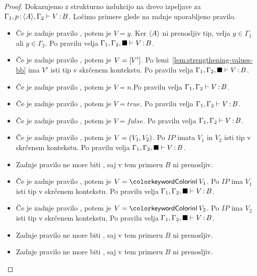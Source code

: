 \begin{proof}
	Dokazujemo z strukturno indukcijo na drevo izpeljave za $\Gamma_1, p \mathinner{:} \langle A \rangle, \Gamma_2 \vdash V \mathinner{:} B$.
	Ločimo primere glede na zadnje uporabljeno pravilo.
	
	\begin{itemize}
		\item Če je zadnje pravilo , potem je $V = y$. Ker $\langle A \rangle$ ni prenosljiv tip, velja $y \in \Gamma_1$ ali $y \in \Gamma_2$.
		Po pravilu  velja $\Gamma_1, \Gamma_2, \blacksquare \vdash V \mathinner{:} B$.
		
		\item Če je zadnje pravilo , potem je $V = [V']$.
		Po lemi~\ref{lem:strengthening-values-bb} ima $V'$ isti tip v skrčenem kontekstu.
		Po pravilu  velja $\Gamma_1, \Gamma_2, \blacksquare \vdash V \mathinner{:} B$.
		
		\item Če je zadnje pravilo , potem je $V = n$.Po pravilu  velja $\Gamma_1, \Gamma_2 \vdash V \mathinner{:} B$.
		\item Če je zadnje pravilo , potem je $V = true$. Po pravilu  velja $\Gamma_1, \Gamma_2 \vdash V \mathinner{:} B$.
		\item Če je zadnje pravilo , potem je $V = false$. Po pravilu  velja $\Gamma_1, \Gamma_2 \vdash V \mathinner{:} B$.
		
		\item Če je zadnje pravilo , potem je $V =( V_1 , V_2 )$.
		Po $IP$ imata $V_1$ in $V_2$ isti tip v skrčenem kontekstu.
		Po pravilu  velja $\Gamma_1, \Gamma_2, \blacksquare \vdash V \mathinner{:} B$.
		
		\item Zadnje pravilo ne more biti , saj v tem primeru $B$ ni prenosljiv.
		
		\item Če je zadnje pravilo , potem je $V = \tminl{V_1}$.
		Po $IP$ ima $V_1$ isti tip v skrčenem kontekstu.
		Po pravilu  velja $\Gamma_1, \Gamma_2, \blacksquare \vdash V \mathinner{:} B$.
		
		\item Če je zadnje pravilo , potem je $V = \tminl{V_2}$.
		Po $IP$ ima $V_2$ isti tip v skrčenem kontekstu.
		Po pravilu  velja $\Gamma_1, \Gamma_2, \blacksquare \vdash V \mathinner{:} B$.
		
		\item Zadnje pravilo ne more biti , saj v tem primeru $B$ ni prenosljiv.
		
		\item Zadnje pravilo ne more biti , saj v tem primeru $B$ ni prenosljiv.
		
	\end{itemize}
\end{proof}

